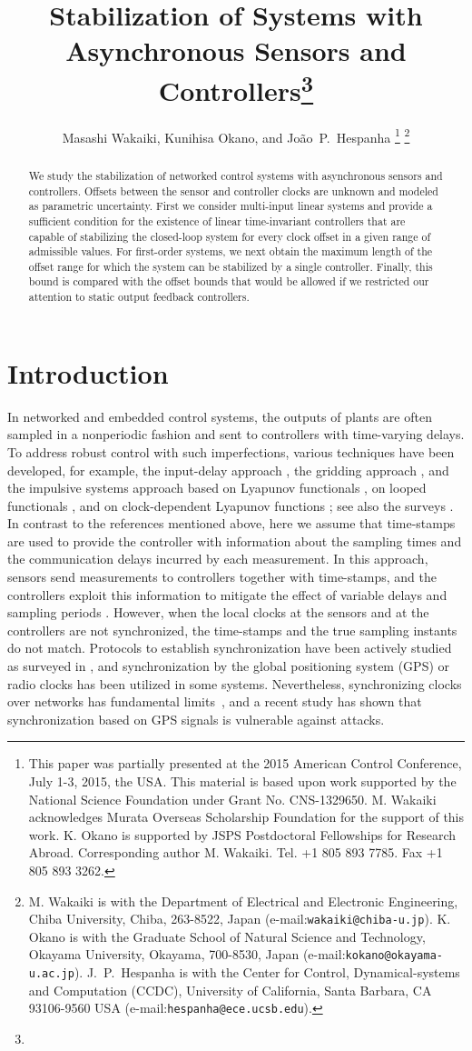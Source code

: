 \documentclass[letterpaper, 12pt, draftcls, onecolumn]{ieeeconf}
\title{\LARGE \bf
Stabilization of Systems with Asynchronous 
Sensors and Controllers\thanks{}
}
\author{Masashi Wakaiki, Kunihisa Okano, and Jo\~ao~P.~Hespanha
\thanks{
This paper was partially
presented at the 2015 American Control Conference,
July 1-3, 2015, the USA.
This material is based upon work supported by 
the National Science
Foundation under Grant No. CNS-1329650.
M. Wakaiki acknowledges Murata Overseas Scholarship Foundation
for the support of this work.
K. Okano is supported by 
JSPS Postdoctoral Fellowships for Research Abroad.
Corresponding author M. Wakaiki. Tel. +1 805 893 7785. 
Fax +1 805 893 3262.
}
\thanks{
M. Wakaiki is with the Department of Electrical and Electronic Engineering, Chiba University,
Chiba, 263-8522, Japan (e-mail:{\tt \small wakaiki@chiba-u.jp}).
K. Okano is with the Graduate School of Natural Science and Technology,
Okayama University, Okayama, 700-8530, Japan 
(e-mail:{\tt \small kokano@okayama-u.ac.jp}).
J.~P.~Hespanha is with the Center for Control,
Dynamical-systems and Computation (CCDC), University of California,
Santa Barbara, CA 93106-9560 USA
(e-mail:{\tt \small hespanha@ece.ucsb.edu}).
}}
\begin{document}
\maketitle
\thispagestyle{empty}
\pagestyle{empty}


\begin{abstract}
We study the stabilization of networked control systems with
asynchronous sensors and controllers. 
Offsets between the sensor and controller clocks
are unknown and
modeled as parametric uncertainty.
First we consider multi-input linear systems and
provide a sufficient condition 
for the existence of linear time-invariant controllers that are 
capable of stabilizing the closed-loop system for 
every clock offset in a given range of admissible values. 
For first-order systems, we next
obtain the maximum length of the offset range
for which the system can be stabilized 
by a single controller. 
Finally,
this bound is compared with the offset bounds that would be allowed if
we restricted our attention to static output feedback controllers.
\end{abstract}


\section{Introduction}
In networked and embedded control systems,
the outputs of plants are often sampled in a nonperiodic fashion and sent to
controllers with time-varying delays.
To address robust control with such imperfections,
various techniques have been developed, for example, the input-delay approach \cite{Fridman2004, Mirkin2007},
the gridding approach \cite{Fujioka2009, Oishi2010, Donkers2011},
and the impulsive systems approach based on
Lyapunov functionals \cite{Naghshtabrizi2010}, on
looped functionals \cite{Briat2012}, and on 
clock-dependent Lyapunov functions \cite{Briat2013};
see also the surveys \cite{Hespanha2007, Hetel2017}.
In contrast to the references mentioned above, 
here we assume that time-stamps are used to provide the
controller with information about the sampling times and the communication delays
incurred by each measurement.
In this approach,
sensors send measurements to controllers
together with time-stamps,
and the controllers
exploit this information to mitigate the effect of variable delays and sampling periods
\cite{Graham2004, Nakamura2008, Garcia2014}.
However, when the local clocks at
the sensors and at the controllers are not synchronized, 
the time-stamps and 
the true sampling instants 
do not match.
Protocols to establish synchronization have been actively
studied as surveyed in \cite{Rhee2009}, 
and synchronization by the global positioning system
(GPS) or radio clocks has been utilized in some systems.
Nevertheless, synchronizing clocks over networks 
has fundamental limits~\cite{Freris2011}, and
a recent study \cite{Jiang2013} 
has shown that synchronization
based on GPS signals is vulnerable against attacks.
\end{document}
